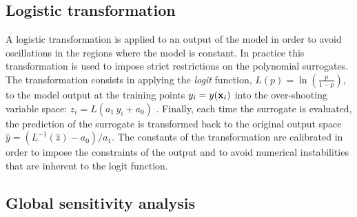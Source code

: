 \documentclass[preprint,12pt]{elsarticle}
\begin{document}



\subsection{Logistic transformation}

A logistic transformation is applied to an output of the model in order to avoid oscillations in the regions where the model is constant. In practice this transformation is used to impose strict restrictions on the polynomial surrogates. %
The transformation consists in applying the \emph{logit} function, $L(p)= \ln \left( \frac{p}{1-p}\right)$, to the model output at the training points $y_i=y(\mathbf{x}_i)$ into the over-shooting variable space: $z_i=L(a_1\,y_i+a_0)$ \cite{simard1998transformation}. %
Finally, each time the surrogate is evaluated, the prediction of the surrogate is transformed back to the original output space $\hat{y}=(L^{-1}(\hat{z})-a_0)/a_1$. The constants of the transformation are calibrated in order to impose the constraints of the output and to avoid numerical instabilities that are inherent to the logit function.



\subsection{Global sensitivity analysis}
\end{document}
